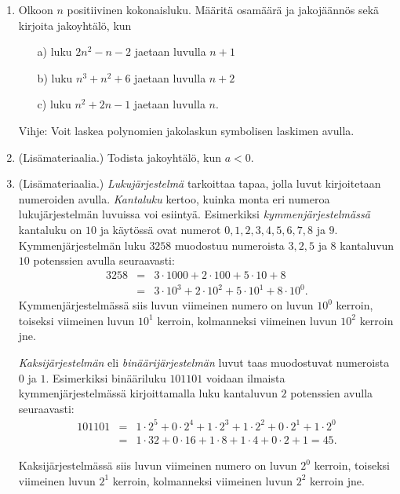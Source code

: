 \begin{enumerate}
\item Olkoon $n$ positiivinen kokonaisluku. Määritä osamäärä ja jakojäännös sekä kirjoita jakoyhtälö, kun
\begin{itemize}
\item[a)] luku $2n^2 - n - 2$ jaetaan luvulla $n + 1$
\item[b)] luku $n^3 + n^2 + 6$ jaetaan luvulla $n + 2$
\item[c)] luku $n^2 + 2n - 1$ jaetaan luvulla $n$.
\end{itemize}
Vihje: Voit laskea polynomien jakolaskun symbolisen laskimen avulla.

\item (Lisämateriaalia.) Todista jakoyhtälö, kun $a<0$.

\item
(Lisämateriaalia.) {\em Lukujärjestelmä} tarkoittaa tapaa, jolla luvut kirjoitetaan numeroiden avulla. {\em Kantaluku} kertoo, kuinka monta eri numeroa lukujärjestelmän luvuissa voi esiintyä. Esimerkiksi {\em kymmenjärjestelmässä} kantaluku on $10$ ja käytössä ovat numerot $0,1,2,3,4,5,6,7,8$ ja $9$. Kymmenjärjestelmän luku $3258$ muodostuu numeroista $3,2,5$ ja $8$ kantaluvun $10$ potenssien avulla seuraavasti:
\begin{eqnarray*}
3258 &=&3\cdot 1000+2\cdot 100+5\cdot 10+8\\
&=& 3\cdot 10^3+2\cdot 10^2+5\cdot 10^1+8\cdot 10^0.
\end{eqnarray*}
Kymmenjärjestelmässä siis luvun viimeinen numero on luvun $10^0$ kerroin, toiseksi viimeinen luvun $10^1$ kerroin, kolmanneksi viimeinen luvun $10^2$ kerroin jne.

{\em Kaksijärjestelmän} eli {\em binäärijärjestelmän} luvut taas muodostuvat numeroista $0$ ja $1$. Esimerkiksi binääriluku $101101$ voidaan ilmaista kymmenjärjestelmässä kirjoittamalla luku kantaluvun $2$ potenssien avulla seuraavasti:
\begin{eqnarray*}
101101&=&1\cdot2^5+0\cdot2^4+1\cdot2^3+1\cdot2^2+0\cdot2^1+1\cdot2^0 \\
&=& 1\cdot32+0\cdot16+1\cdot8+1\cdot4+0\cdot2+1=45.
\end{eqnarray*}

Kaksijärjestelmässä siis luvun viimeinen numero on luvun $2^0$ kerroin, toiseksi viimeinen luvun $2^1$ kerroin, kolmanneksi viimeinen luvun $2^2$ kerroin jne.


\end{enumerate}
